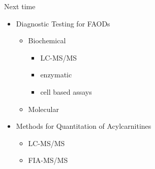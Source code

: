\documentclass[presentation, smaller]{beamer}
\begin{document}
\begin{frame}[label={sec:orgheadline20}]{Next time}
\begin{itemize}
\item Diagnostic Testing for FAODs
\begin{itemize}
\item Biochemical
\begin{itemize}
\item LC-MS/MS
\item enzymatic
\item cell based assays
\end{itemize}
\item Molecular
\end{itemize}

\item Methods for Quantitation of Acylcarnitines
\begin{itemize}
\item LC-MS/MS
\item FIA-MS/MS
\end{itemize}
\end{itemize}
\end{frame}
\end{document}
